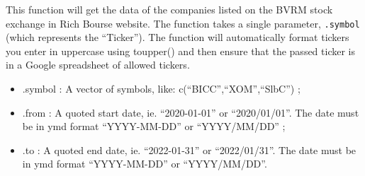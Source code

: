 \documentclass[
]{article}
\providecommand{\tightlist}{%
  \setlength{\itemsep}{0pt}\setlength{\parskip}{0pt}}
\begin{document}
This function will get the data of the companies listed on the BVRM
stock exchange in Rich Bourse website. The function takes a single
parameter, \texttt{.symbol} (which represents the ``Ticker''). The
function will automatically format tickers you enter in uppercase using
toupper() and then ensure that the passed ticker is in a Google
spreadsheet of allowed tickers.

\begin{itemize}
\tightlist
\item
  .symbol : A vector of symbols, like: c(``BICC'',``XOM'',``SlbC'') ;
\item
  .from : A quoted start date, ie. ``2020-01-01'' or ``2020/01/01''. The
  date must be in ymd format ``YYYY-MM-DD'' or ``YYYY/MM/DD'' ;
\item
  .to : A quoted end date, ie. ``2022-01-31'' or ``2022/01/31''. The
  date must be in ymd format ``YYYY-MM-DD'' or ``YYYY/MM/DD''.
\end{itemize}
\end{document}
